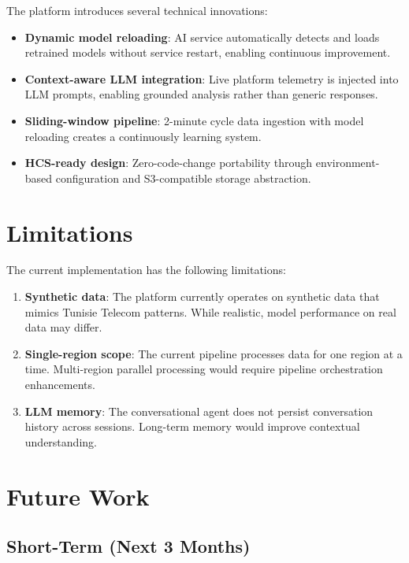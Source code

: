 The platform introduces several technical innovations:

\begin{itemize}
    \item \textbf{Dynamic model reloading}: AI service automatically detects and loads retrained models without service restart, enabling continuous improvement.
    \item \textbf{Context-aware LLM integration}: Live platform telemetry is injected into LLM prompts, enabling grounded analysis rather than generic responses.
    \item \textbf{Sliding-window pipeline}: 2-minute cycle data ingestion with model reloading creates a continuously learning system.
    \item \textbf{HCS-ready design}: Zero-code-change portability through environment-based configuration and S3-compatible storage abstraction.
\end{itemize}

\section{Limitations}

The current implementation has the following limitations:

\begin{enumerate}
    \item \textbf{Synthetic data}: The platform currently operates on synthetic data that mimics Tunisie Telecom patterns. While realistic, model performance on real data may differ.
    \item \textbf{Single-region scope}: The current pipeline processes data for one region at a time. Multi-region parallel processing would require pipeline orchestration enhancements.
    \item \textbf{LLM memory}: The conversational agent does not persist conversation history across sessions. Long-term memory would improve contextual understanding.
\end{enumerate}

\section{Future Work}

\subsection{Short-Term (Next 3 Months)}

